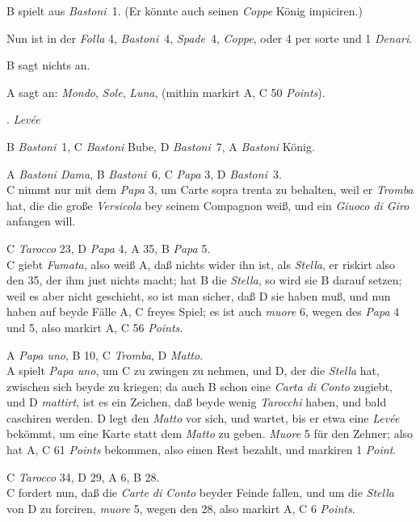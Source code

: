 \documentclass[11pt,a6paper,twoside]{article}
\newcounter{leveescnt}
\newenvironment{leveeslist}{
  \begin{list}
    {\arabic{leveescnt}. {\textit{Levée}}}
    {\usecounter{leveescnt}
      \setlength{\labelwidth}{2em}
      \setlength{\labelsep}{1em}
      \setlength{\itemsep}{0pt}
      \setlength{\parsep}{0pt}
      \setlength{\leftmargin}{1.5em}
      \setlength{\itemindent}{1em} %
    }
}{\end{list}}
\begin{document}
B spielt aus \textit{Bastoni}~1. (Er könnte auch seinen \textit{Coppe} König impiciren.)

Nun ist in der \textit{Folla} 4, \textit{Bastoni}~4, \textit{Spade}~4, \textit{Coppe}, oder 4 per sorte und 1 \textit{Denari}.

B sagt nichts an.

A sagt an: \textit{Mondo}, \textit{Sole}, \textit{Luna}, (mithin markirt A, C 50 \textit{Points}).

\begin{leveeslist}
\item B \textit{Bastoni}~1, C \textit{Bastoni} Bube, D \textit{Bastoni}~7, A \textit{Bastoni} König.
\item A \textit{Bastoni Dama}, B \textit{Bastoni}~6, C \textit{Papa} 3, D \textit{Bastoni}~3. \\C nimmt nur mit dem \textit{Papa} 3, um Carte sopra trenta zu behalten, weil er \textit{Tromba} hat, die die große \textit{Versicola} bey seinem Compagnon weiß, und ein \textit{\mbox{Giuoco} di \mbox{Giro}} anfangen will.
\item C \textit{Tarocco} 23, D \textit{Papa} 4, A 35, B \textit{Papa} 5. \\C giebt \textit{Fumata}, also weiß A, daß nichts wider ihn ist, als \textit{Stella}, er riskirt also den 35, der ihm just nichts macht; hat B die \textit{Stella}, so wird sie B darauf setzen; weil es aber nicht geschieht, so ist man sicher, daß D sie haben muß, und nun haben auf beyde Fälle A, C freyes Spiel; es ist auch \textit{muore} 6, wegen des \textit{Papa} 4 und 5, also markirt A, C 56 \textit{Points}.
\item A \textit{Papa uno}, B 10, C \textit{Tromba}, D \textit{Matto}. \\A spielt \textit{Papa uno}, um C zu zwingen zu nehmen, und D, der die \textit{Stella} hat, zwischen sich beyde zu kriegen; da auch B schon eine \textit{Carta di Conto} zugiebt, und D \textit{mattirt}, ist es ein Zeichen, daß beyde wenig \textit{Tarocchi} haben, und bald caschiren werden. D legt den \textit{Matto} vor sich, und wartet, bis er etwa eine \textit{Levée} bekömmt, um eine Karte statt dem \textit{Matto} zu geben. \textit{Muore} 5 für den Zehner; also hat A, C 61 \textit{Points} bekommen, also einen Rest bezahlt, und markiren 1 \textit{Point}.
\item C \textit{Tarocco} 34, D 29, A 6, B 28. \\C fordert nun, daß die \textit{Carte di Conto} beyder Feinde fallen, und um die \textit{Stella} von D zu forciren, \textit{muore} 5, wegen den 28, also markirt A, C 6 \textit{Points}.

\end{leveeslist}
\end{document}
